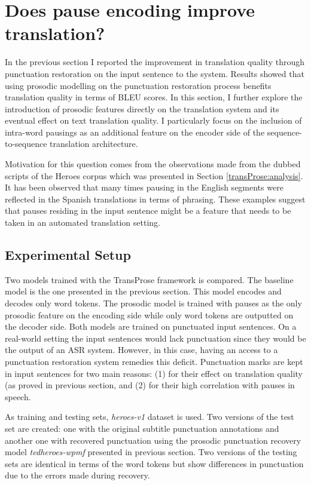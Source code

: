 \section{Does pause encoding improve translation?}
\label{transProse:Q2}
In the previous section I reported the improvement in translation quality through punctuation restoration on the input sentence to the system. Results showed that using prosodic modelling on the punctuation restoration process benefits translation quality in terms of BLEU scores. In this section, I further explore the introduction of prosodic features directly on the translation system and its eventual effect on text translation quality. I particularly focus on the inclusion of intra-word pausings as an additional feature on the encoder side of the sequence-to-sequence translation architecture. 

Motivation for this question comes from the observations made from the dubbed scripts of the Heroes corpus which was presented in Section \ref{transProse:analysis}. It has been observed that many times pausing in the English segments were reflected in the Spanish translations in terms of phrasing. These examples suggest that pauses residing in the input sentence might be a feature that needs to be taken in an automated translation setting. 

\subsection*{Experimental Setup }

Two models trained with the TransProse framework is compared. The baseline model is the one presented in the previous section. This model encodes and decodes only word tokens. The prosodic model is trained with pauses as the only prosodic feature on the encoding side while only word tokens are outputted on the decoder side. Both models are trained on punctuated input sentences. On a real-world setting the input sentences would lack punctuation since they would be the output of an ASR system. However, in this case, having an access to a punctuation restoration system remedies this deficit. Punctuation marks are kept in input sentences for two main reasons: (1) for their effect on translation quality (as proved in previous section, and (2) for their high correlation with pauses in speech. 

As training and testing sets, \textit{heroes-v1} dataset is used. Two versions of the test set are created: one with the original subtitle punctuation annotations and another one with recovered punctuation using the prosodic punctuation recovery model \textit{tedheroes-wpmf} presented in previous section. Two versions of the testing sets are identical in terms of the word tokens but show differences in punctuation due to the errors made during recovery.

